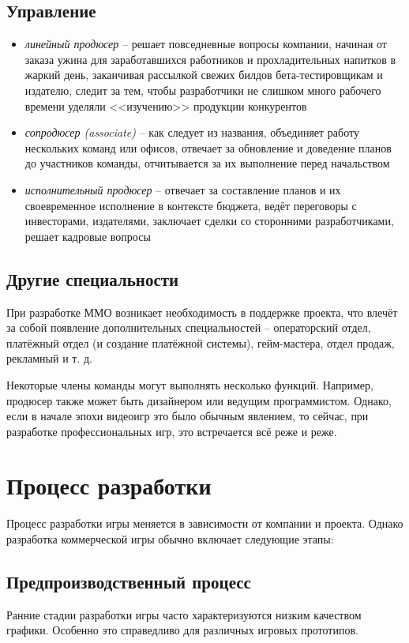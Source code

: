 \section{Управление}
\begin{itemize}
    \item \emph{линейный продюсер} -- решает повседневные вопросы компании, начиная от заказа ужина для 
        заработавшихся работников и прохладительных напитков в жаркий день, заканчивая рассылкой свежих 
        билдов бета-тестировщикам и издателю, следит за тем, чтобы разработчики не слишком много рабочего 
        времени уделяли <<изучению>> продукции конкурентов
    \item \emph{сопродюсер (associate)} -- как следует из названия, объединяет работу нескольких команд 
        или офисов, отвечает за обновление и доведение планов до участников команды, отчитывается за их 
        выполнение перед начальством
    \item \emph{исполнительный продюсер} -- отвечает за составление планов и их своевременное исполнение в 
        контексте бюджета, ведёт переговоры с инвесторами, издателями, заключает сделки со сторонними 
        разработчиками, решает кадровые вопросы
\end{itemize}

\section{Другие специальности}

При разработке ММО возникает необходимость в поддержке проекта, что влечёт за собой появление дополнительных 
специальностей -- операторский отдел, платёжный отдел (и создание платёжной системы), гейм-мастера, отдел 
продаж, рекламный и т. д.

Некоторые члены команды могут выполнять несколько функций. Например, продюсер также может быть дизайнером 
или ведущим программистом. Однако, если в начале эпохи видеоигр это было обычным явлением, то сейчас, при 
разработке профессиональных игр, это встречается всё реже и реже.

\chapter{Процесс разработки}

Процесс разработки игры меняется в зависимости от компании и проекта. Однако разработка коммерческой игры 
обычно включает следующие этапы:

\section{Предпроизводственный процесс}
Ранние стадии разработки игры часто характеризуются низким качеством графики. Особенно это справедливо для 
различных игровых прототипов.

